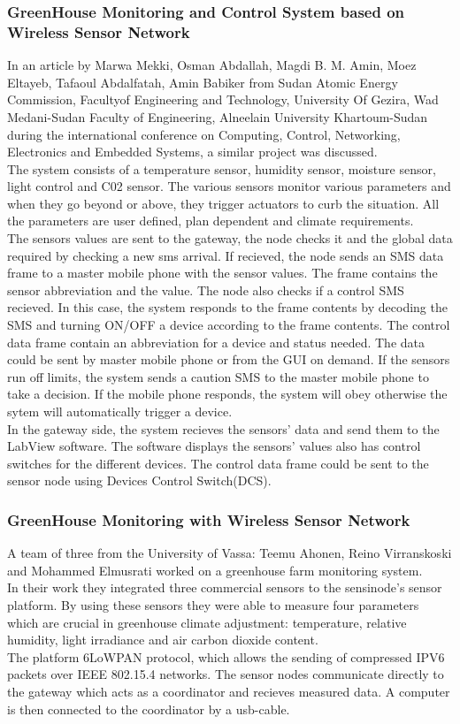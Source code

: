 \documentclass[12pt, a4paper]{article}
\begin{document}
\subsubsection{GreenHouse Monitoring and Control System based on Wireless Sensor Network}
In an article by Marwa Mekki, Osman Abdallah, Magdi B. M. Amin, Moez Eltayeb, Tafaoul Abdalfatah, Amin Babiker from Sudan Atomic Energy Commission, Facultyof Engineering and Technology, University Of Gezira, Wad Medani-Sudan Faculty of Engineering, Alneelain University Khartoum-Sudan during the international conference on Computing, Control, Networking, Electronics and Embedded Systems, a similar project was discussed.\\
The system consists of a temperature sensor, humidity sensor, moisture sensor, light control and C02 sensor. The various sensors monitor various parameters and when they go beyond or above, they trigger actuators to curb the situation. All the parameters are user defined, plan dependent and climate requirements.\\
The sensors values are sent to the gateway, the node checks it and the global data required by checking a new sms arrival. If recieved, the node sends an SMS data frame to a master mobile phone with the sensor values. The frame contains the sensor abbreviation and the value. The node also checks if a control SMS recieved. In this case, the system responds to the frame contents by decoding the SMS and turning ON/OFF a device according to the frame contents. The control data frame contain an abbreviation for a device and status needed. The data could be sent by master mobile phone or from the GUI on demand. If the sensors run off limits, the system sends a caution SMS to the master mobile phone to take a decision. If the mobile phone responds, the system will obey otherwise the sytem will automatically trigger a device.\\
In the gateway side, the system recieves the sensors' data and send them to the LabView software. The software displays the sensors' values also has control switches for the different devices. The control data frame could be sent to the sensor node using Devices Control Switch(DCS).  
 
\subsubsection{GreenHouse Monitoring with Wireless Sensor Network}
A team of three from the University of Vassa: Teemu Ahonen, Reino Virranskoski and Mohammed Elmusrati worked on a greenhouse farm monitoring system.\\
In their work they integrated three commercial sensors to the sensinode's sensor platform. By using these sensors they were able to measure four parameters which are crucial in greenhouse climate adjustment: temperature, relative humidity, light irradiance and air carbon dioxide content.\\
The platform 6LoWPAN protocol, which allows the sending of compressed IPV6 packets over IEEE 802.15.4 networks. The sensor nodes communicate directly to the gateway which acts as a coordinator and recieves measured data.  A computer is then connected to the coordinator by a usb-cable. 
\end{document}
